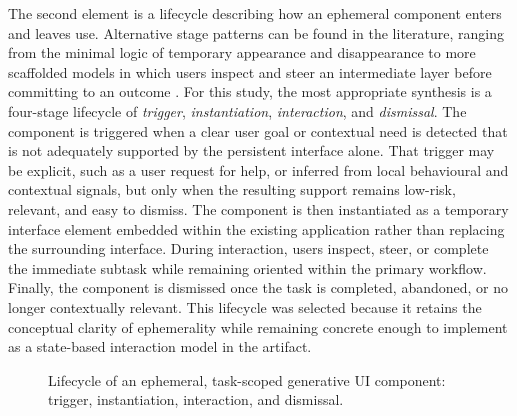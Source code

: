The second element is a lifecycle describing how an ephemeral component enters and leaves use. Alternative stage patterns can be found in the literature, ranging from the minimal logic of temporary appearance and disappearance \parencite{Doring2013EphemeralUI} to more scaffolded models in which users inspect and steer an intermediate layer before committing to an outcome \parencite{Cheng2024Biscuit}. For this study, the most appropriate synthesis is a four-stage lifecycle of \emph{trigger}, \emph{instantiation}, \emph{interaction}, and \emph{dismissal}. The component is triggered when a clear user goal or contextual need is detected that is not adequately supported by the persistent interface alone. That trigger may be explicit, such as a user request for help, or inferred from local behavioural and contextual signals, but only when the resulting support remains low-risk, relevant, and easy to dismiss. The component is then instantiated as a temporary interface element embedded within the existing application rather than replacing the surrounding interface. During interaction, users inspect, steer, or complete the immediate subtask while remaining oriented within the primary workflow. Finally, the component is dismissed once the task is completed, abandoned, or no longer contextually relevant. This lifecycle was selected because it retains the conceptual clarity of ephemerality while remaining concrete enough to implement as a state-based interaction model in the artifact.

\begin{figure}[htbp]
    \centering
    \caption{Lifecycle of an ephemeral, task-scoped generative UI component: trigger, instantiation, interaction, and dismissal.}
    \label{fig:lifecycle}
\end{figure}


